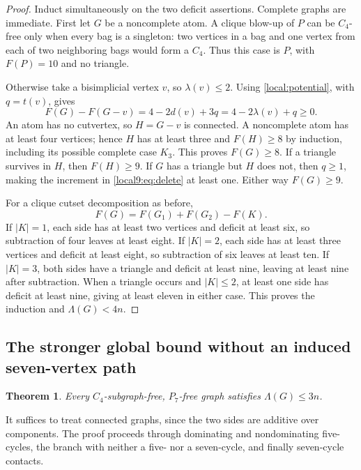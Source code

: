 \documentclass[11pt,a4paper]{article}
\newtheorem{theorem}{Theorem}[section]
\theoremstyle{definition}\newtheorem{definition}[theorem]{Definition}
\theoremstyle{remark}\newtheorem{remark}[theorem]{Remark}
\begin{document}
\begin{proof}
Induct simultaneously on the two deficit assertions. Complete graphs are
immediate. First let $G$ be a noncomplete atom. A clique blow-up of $P$
can be $C_4$-free only when every bag is a singleton: two vertices in a
bag and one vertex from each of two neighboring bags would form a $C_4$.
Thus this case is $P$, with $F(P)=10$ and no triangle.

Otherwise take a bisimplicial vertex $v$, so $\lambda(v)\le2$. Using
\eqref{local:potential}, with $q=t(v)$, gives
\begin{equation}\label{local9:eq:delete}
 F(G)-F(G-v)=4-2d(v)+3q=4-2\lambda(v)+q\ge0.
\end{equation}
An atom has no cutvertex, so $H=G-v$ is connected. A noncomplete atom
has at least four vertices; hence $H$ has at least three and $F(H)\ge8$
by induction, including its possible complete case $K_3$. This proves
$F(G)\ge8$. If a triangle survives in $H$, then $F(H)\ge9$. If $G$
has a triangle but $H$ does not, then $q\ge1$, making the increment in
\eqref{local9:eq:delete} at least one. Either way $F(G)\ge9$.

For a clique cutset decomposition as before,
\[
 F(G)=F(G_1)+F(G_2)-F(K).
\]
If $|K|=1$, each side has at least two vertices and deficit at least six,
so subtraction of four leaves at least eight. If $|K|=2$, each side has
at least three vertices and deficit at least eight, so subtraction of six
leaves at least ten. If $|K|=3$, both sides have a triangle and deficit at
least nine, leaving at least nine after subtraction. When a triangle occurs
and $|K|\le2$, at least one side has deficit at least nine, giving at
least eleven in either case. This proves the induction and $\Lambda(G)<4n$.
\end{proof}



\subsection{The stronger global bound without an induced seven-vertex path}
\begin{theorem}\label{local15:thm:general}
Every $C_4$-subgraph-free, $P_7$-free graph satisfies $\Lambda(G)\le3n$.
\end{theorem}
It suffices to treat connected graphs, since the two sides are additive
over components. The proof proceeds through dominating and
nondominating five-cycles, the branch with neither a five- nor a
seven-cycle, and finally seven-cycle contacts.
\end{document}
